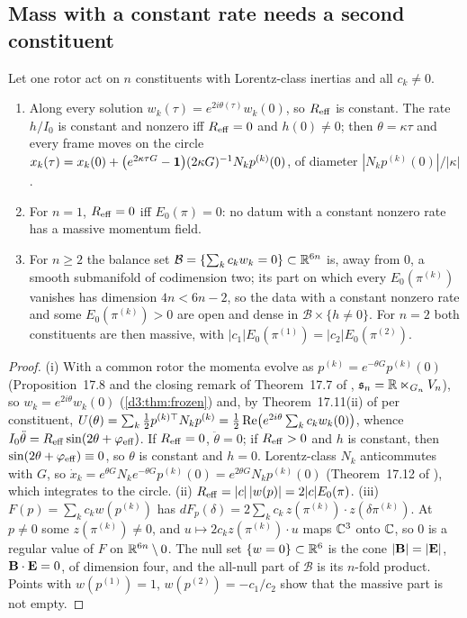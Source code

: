 \subsection{Mass with a constant rate needs a second constituent}
\label{d6:sec:balance}

\begin{theorem}
\label{d6:thm:balance}
Let one rotor act on $n$ constituents with Lorentz-class inertias and all $c_k\neq0$.
\begin{enumerate}[label=(\roman*),leftmargin=2.2em]
\item Along every solution $w_k(\tau)=e^{2i\theta(\tau)}w_k(0)$, so $R_{\rm eff}$ is constant. The rate $h/I_0$ is constant and nonzero iff
$R_{\rm eff}=0$ and $h(0)\neq0$; then $\theta=\kappa\tau$ and every frame moves on the circle
$x_k(\tau)=x_k(0)+\bigl(e^{2\kappa\tau G}-\mathbf 1\bigr)(2\kappa G)^{-1}N_kp^{(k)}(0)$, of diameter $|N_kp^{(k)}(0)|/|\kappa|$.
\item For $n=1$, $R_{\rm eff}=0$ iff $E_0(\pi)=0$: no datum with a constant nonzero rate has a massive momentum field.
\item For $n\ge2$ the balance set $\mathcal B=\{\sum_kc_kw_k=0\}\subset\mathbb{R}^{6n}$ is, away from $0$, a smooth submanifold of codimension two; its
part on which every $E_0(\pi^{(k)})$ vanishes has dimension $4n<6n-2$, so the data with a constant nonzero rate and some $E_0(\pi^{(k)})>0$ are
open and dense in $\mathcal B\times\{h\neq0\}$. For $n=2$ both constituents are then massive, with $|c_1|E_0(\pi^{(1)})=|c_2|E_0(\pi^{(2)})$.
\end{enumerate}
\end{theorem}

\begin{proof}
(i) With a common rotor the momenta evolve as $p^{(k)}=e^{-\theta G}p^{(k)}(0)$ (Proposition~17.8 and the closing remark of Theorem~17.7 of
\cite{ES17}, $\mathfrak s_n=\mathbb{R}\ltimes_{G_n}V_n$), so $w_k=e^{2i\theta}w_k(0)$ (\cref{d3:thm:frozen}) and, by Theorem~17.11(ii) of \cite{ES17} per
constituent, $U(\theta)=\sum_k\tfrac12 p^{(k)\top}N_kp^{(k)}=\tfrac12\operatorname{Re}\bigl(e^{2i\theta}\sum_kc_kw_k(0)\bigr)$, whence
$I_0\ddot\theta=R_{\rm eff}\sin(2\theta+\varphi_{\rm eff})$. If $R_{\rm eff}=0$, $\ddot\theta=0$; if $R_{\rm eff}>0$ and $h$ is constant, then
$\sin(2\theta+\varphi_{\rm eff})\equiv0$, so $\theta$ is constant and $h=0$. Lorentz-class $N_k$ anticommutes with $G$, so
$\dot x_k=e^{\theta G}N_ke^{-\theta G}p^{(k)}(0)=e^{2\theta G}N_kp^{(k)}(0)$ (Theorem~17.12 of \cite{ES17}), which integrates to the circle.
(ii) $R_{\rm eff}=|c|\,|w(p)|=2|c|E_0(\pi)$. (iii) $F(p)=\sum_kc_kw(p^{(k)})$ has $dF_p(\delta)=2\sum_kc_k\,z(\pi^{(k)})\cdot z(\delta\pi^{(k)})$. At
$p\neq0$ some $z(\pi^{(k)})\neq0$, and $u\mapsto2c_kz(\pi^{(k)})\cdot u$ maps $\mathbb{C}^3$ onto $\mathbb{C}$, so $0$ is a regular value of $F$ on
$\mathbb{R}^{6n}\setminus0$. The null set $\{w=0\}\subset\mathbb{R}^6$ is the cone $|\mathbf B|=|\mathbf E|$, $\mathbf B\cdot\mathbf E=0$, of dimension four, and the all-null part of
$\mathcal B$ is its $n$-fold product. Points with $w(p^{(1)})=1$, $w(p^{(2)})=-c_1/c_2$ show that the massive part is not empty.
\end{proof}


